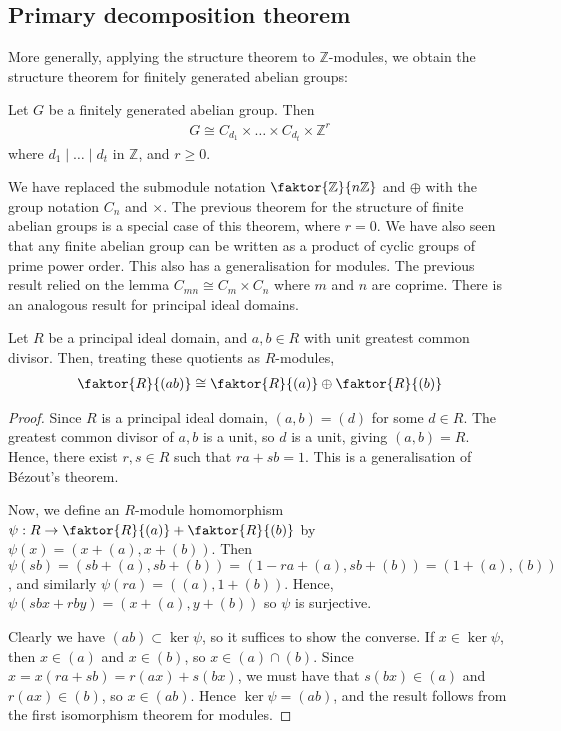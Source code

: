 \subsection{Primary decomposition theorem}
More generally, applying the structure theorem to $\mathbb Z$-modules, we obtain the structure theorem for finitely generated abelian groups:
\begin{theorem}
	Let $G$ be a finitely generated abelian group.
	Then
	\begin{align*}
		G \cong C_{d_1} \times \dots \times C_{d_t} \times \mathbb Z^r
	\end{align*}
	where $d_1 \mid \dots \mid d_t$ in $\mathbb Z$, and $r \geq 0$.
\end{theorem}
We have replaced the submodule notation $\faktor{\mathbb Z}{n\mathbb Z}$ and $\oplus$ with the group notation $C_n$ and $\times$.
The previous theorem for the structure of finite abelian groups is a special case of this theorem, where $r = 0$.
We have also seen that any finite abelian group can be written as a product of cyclic groups of prime power order.
This also has a generalisation for modules.
The previous result relied on the lemma $C_{mn} \cong C_m \times C_n$ where $m$ and $n$ are coprime.
There is an analogous result for principal ideal domains.
\begin{lemma}
	Let $R$ be a principal ideal domain, and $a, b \in R$ with unit greatest common divisor.
	Then, treating these quotients as $R$-modules,
	\begin{align*}
		\faktor{R}{(ab)} \cong \faktor{R}{(a)} \oplus \faktor{R}{(b)}
	\end{align*}
\end{lemma}
\begin{proof}
	Since $R$ is a principal ideal domain, $(a,b) = (d)$ for some $d \in R$.
	The greatest common divisor of $a, b$ is a unit, so $d$ is a unit, giving $(a,b) = R$.
	Hence, there exist $r,s \in R$ such that $ra + sb = 1$.
	This is a generalisation of B\'ezout's theorem.

	Now, we define an $R$-module homomorphism $\psi : R \to \faktor{R}{(a)} + \faktor{R}{(b)}$ by $\psi(x) = (x+(a), x+(b))$.
	Then $\psi(sb) = (sb+(a), sb+(b)) = (1-ra+(a),sb+(b)) = (1+(a), (b))$, and similarly $\psi(ra) = ((a),1+(b))$.
	Hence, $\psi(sbx + rby) = (x+(a),y+(b))$ so $\psi$ is surjective.

	Clearly we have $(ab) \subset \ker \psi$, so it suffices to show the converse.
	If $x \in \ker \psi$, then $x \in (a)$ and $x \in (b)$, so $x \in (a) \cap (b)$.
	Since $x = x(ra+sb) = r(ax) + s(bx)$, we must have that $s(bx) \in (a)$ and $r(ax) \in (b)$, so $x \in (ab)$.
	Hence $\ker \psi = (ab)$, and the result follows from the first isomorphism theorem for modules.
\end{proof}
